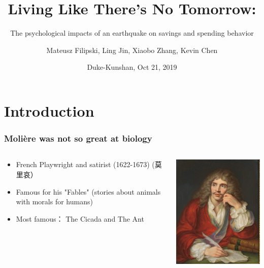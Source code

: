 \documentclass[aspectratio=169]{beamer}
\title[Living Like There's No Tomorrow]{Living Like There's No Tomorrow:}
\subtitle{The psychological impacts of an earthquake on savings and spending behavior}
\author{Mateusz Filipski, Ling Jin, Xiaobo Zhang, Kevin Chen}
\institute{UGA, Huazhong Agricultural U., Beijing U., Zhejiang U., IFPRI}
\date{Duke-Kunshan, Oct 21, 2019}
\begin{document}
\frame{\titlepage}

\section*{Introduction}
\begin{frame}[label=top]
    \frametitle{\Large{Molière was not so great at biology}}
    \begin{columns}
    \begin{column}{0.5\textwidth}
        \begin{itemize}
            \item French Playwright and satirist (1622-1673) (莫里哀）
            \item Famous for his "Fables" (stories about animals with morals for humans)
            \item Most famous： 
            The Cicada and The Ant
        \end{itemize}
    \end{column}
    \begin{column}{0.5\textwidth}  %
    \begin{center}
    \includegraphics[scale=0.55]{pics/moliere.png}     \end{center}
\end{column}
\end{columns}
\end{frame}  
\end{document}
